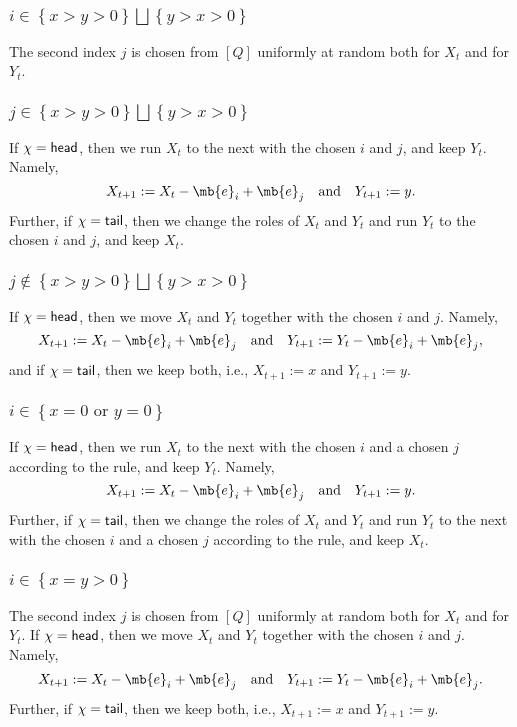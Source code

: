 \documentclass[12pt, reqno]{amsart}
\begin{document}
\subsubsection*{ $i\in \left\{x>y>0\right\}\bigsqcup\left\{y>x>0\right\}$}
The second index $j$ is chosen from $[Q]$ uniformly at random both for $X_t$ and for $Y_t$.
\subsubsection*{ $j \in \left\{x>y>0\right\}\bigsqcup\left\{y>x>0\right\}$}
If $\chi={\sf head}$,
then we run $X_t$ to the next with the chosen $i$ and $j$, and keep $Y_t$.
Namely,
\[
X_{t+1}:=X_t-\mb{e}_i+\mb{e}_j \quad \text{and} \quad Y_{t+1}:=y.
\]
Further,
if $\chi={\sf tail}$,
then we change the roles of $X_t$ and $Y_t$ and run $Y_t$ to the chosen $i$ and $j$,
and keep $X_t$.
\subsubsection*{ $j \notin \left\{x>y>0\right\}\bigsqcup\left\{y>x>0\right\}$} If $\chi={\sf head}$,
then we move $X_t$ and $Y_t$ together with the chosen $i$ and $j$.
Namely,
\[
X_{t+1}:=X_t-\mb{e}_i+\mb{e}_j \quad \text{and} \quad Y_{t+1}:=Y_t-\mb{e}_i+\mb{e}_j,
\]
and if $\chi={\sf tail}$,
then we keep both, i.e., $X_{t+1}:=x$ and $Y_{t+1}:=y$.
\subsubsection*{ $i \in \left\{\text{$x=0$ or $y=0$}\right\}$}
If $\chi={\sf head}$,
then we run $X_t$ to the next with the chosen $i$ and a chosen $j$ according to the rule,
and keep $Y_t$.
Namely,
\[
X_{t+1}:=X_t-\mb{e}_i+\mb{e}_j \quad \text{and} \quad Y_{t+1}:=y.
\]
Further, if $\chi={\sf tail}$,
then we change the roles of $X_t$ and $Y_t$ and run $Y_t$ to the next with the chosen $i$ and a chosen $j$ according to the rule, and keep $X_t$.
\subsubsection*{ $i \in \left\{x=y>0\right\}$}
The second index $j$ is chosen from $[Q]$ uniformly at random both for $X_t$ and for $Y_t$.
If $\chi={\sf head}$,
then we move $X_t$ and $Y_t$ together with the chosen $i$ and $j$.
Namely,
\[
X_{t+1}:=X_t-\mb{e}_i+\mb{e}_j
\quad \text{and} \quad
Y_{t+1}:=Y_t-\mb{e}_i+\mb{e}_j.
\]
Further, if $\chi={\sf tail}$,
then we keep both, i.e., $X_{t+1}:=x$ and $Y_{t+1}:=y$.
\end{document}
